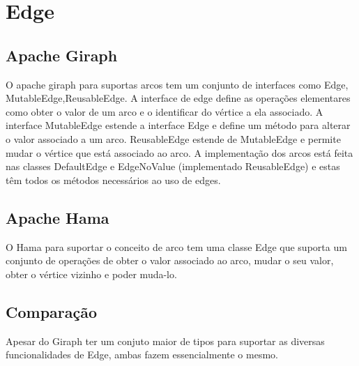 \newpage
\section*{Edge}

\subsection*{Apache Giraph}
O apache giraph para suportas arcos tem um conjunto de interfaces como Edge, MutableEdge,ReusableEdge. A interface de edge define as operações
elementares como obter o valor de um arco e o identificar do vértice a ela associado. A interface MutableEdge estende a interface Edge e define
um método para alterar o valor associado a um arco. ReusableEdge estende de MutableEdge e permite mudar o vértice que está associado ao arco.
A implementação dos arcos está feita nas classes DefaultEdge e EdgeNoValue (implementado ReusableEdge) e estas têm todos os métodos necessários ao uso de edges.

\subsection*{Apache Hama}
O Hama para suportar o conceito de arco tem uma classe Edge que suporta um conjunto de operações de obter o valor associado ao arco, mudar o seu valor,
obter o vértice vizinho e poder muda-lo. 

\subsection*{Comparação}
Apesar do Giraph ter um conjuto maior de tipos para suportar as diversas funcionalidades de Edge, ambas fazem essencialmente
o mesmo.